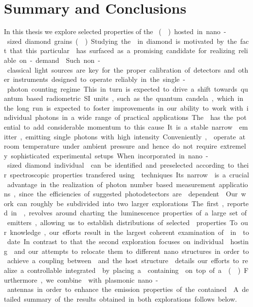 

 \chapter*{Summary and Conclusions}	\label{ch::conclusion}

   In this thesis we explore selected properties of the \si \cc (\siv) hosted in nano-sized diamond grains (\nds). Studying the \sivc in diamond is motivated by the fact that this particular \cc has surfaced as a promising candidate for realizing reliable on-demand \spss. Such non-classical light sources are key for the proper calibration of detectors and other instruments designed to operate reliably in the single-photon counting regime. This in turn is expected to drive a shift towards quantum based radiometric SI units, such as the quantum candela, which in the long run is expected to foster improvements in our ability to work with individual photons in a wide range of practical applications.

   The \siv has the potential to add considerable momentum to this cause. It is a stable narrow \lw emitter, emitting single photons with high intensity. Conveniently, \sivs operate at room temperature under ambient pressure and hence do not require extremely sophisticated experimental setups. When incorporated in nano-sized diamond individual \sivs can be identified and preselected according to their spectroscopic properties transfered using \pp techniques. Its narrow \lw is a crucial advantage in the realization of photon number based measurement applications, since the efficiencies of suggested photodetectors are \wl dependent \cite{vaigu2017experimental}.

   Our work can roughly be subdivided into two larger explorations. The first, reported in , revolves around charting the luminescence properties of a large set of emitters, allowing us to establish distributions of selected \siv properties. To our knowledge, our efforts result in the largest coherent examination of \sivs in \nds to date. In contrast to that the second exploration focuses on individual \nds hosting \sivs and our attempts to relocate them to different nano structures in order to achieve a coupling between \sivs and the host structure.  details our efforts to realize a controllable integrated \sps by placing a \nd containing \sivs on top of a \vcsel (\VCSEL). Furthermore, we combine \nds with plasmonic nano-antennas in order to enhance the emission properties of the contained \sivs. A detailed summary of the results obtained in both explorations follows below.


